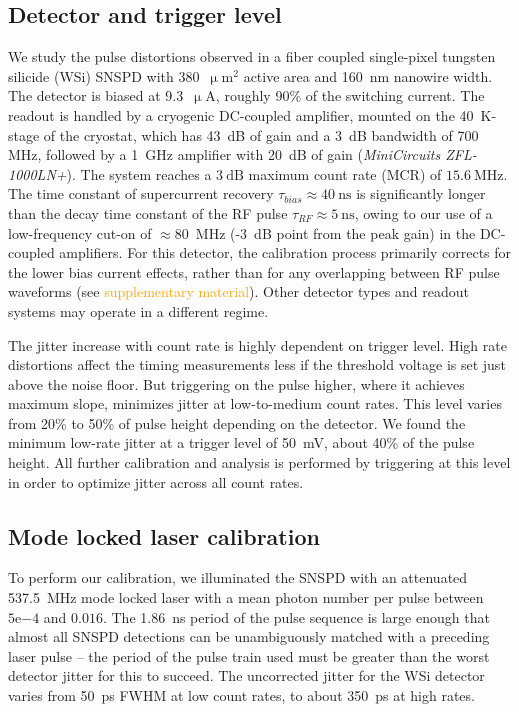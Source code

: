 \documentclass[11pt]{caltech_thesis} %
\begin{document}
\hypertarget{detector-and-trigger-level}{%
\subsection{Detector and trigger level}\label{detector-and-trigger-level}}

We study the pulse distortions observed in a fiber coupled single-pixel tungsten silicide (WSi) SNSPD with 380~$\mathrm{\upmu m^2}$ active area and 160~nm nanowire width. The detector is biased at 9.3~$\mathrm{\upmu A}$, roughly 90\% of the switching current. The readout is handled by a cryogenic DC-coupled amplifier, mounted on the 40~K-stage of the cryostat, which has 43~dB of gain and a 3~dB bandwidth of 700 MHz, followed by a 1~GHz amplifier with 20~dB of gain (\emph{MiniCircuits ZFL-1000LN+}). The system reaches a $3~\mathrm{dB}$ maximum count rate (MCR) of $15.6~\mathrm{MHz}$. The time constant of supercurrent recovery $\tau_{bias} \approx 40~\mathrm{ns}$ is significantly longer than the decay time constant of the RF pulse $\tau_{RF} \approx 5~\mathrm{ns}$, owing to our use of a low-frequency cut-on of $\approx 80$~MHz (-3~dB point from the peak gain) in the DC-coupled amplifiers. For this detector, the calibration process primarily corrects for the lower bias current effects, rather than for any overlapping between RF pulse waveforms (see \textcolor{orange}{supplementary material}). Other detector types and readout systems may operate in a different regime.

The jitter increase with count rate is highly dependent on trigger level. High rate distortions affect the timing measurements less if the threshold voltage is set just above the noise floor.
But triggering on the pulse higher, where it achieves maximum slope, minimizes jitter at low-to-medium count rates. This level varies from 20\% to 50\% of pulse height depending on the detector. We found the minimum low-rate jitter at a trigger level of 50~mV, about 40\% of the pulse height. All further calibration and analysis is performed by triggering at this level in order to optimize jitter across all count rates.

\hypertarget{mode-locked-laser-calibration}{%
\subsection{Mode locked laser calibration}\label{mode-locked-laser-calibration}}

To perform our calibration, we illuminated the SNSPD with an attenuated 537.5~MHz mode locked laser with a mean photon number per pulse between $5\mathrm{e}{-4}$ and $0.016$. The 1.86~ns period of the pulse sequence is large enough that almost all SNSPD detections can be unambiguously matched with a preceding laser pulse -- the period of the pulse train used must be greater than the worst detector jitter for this to succeed. The uncorrected jitter for the WSi detector varies from 50~ps FWHM at low count rates, to about 350~ps at high rates.
\end{document}
